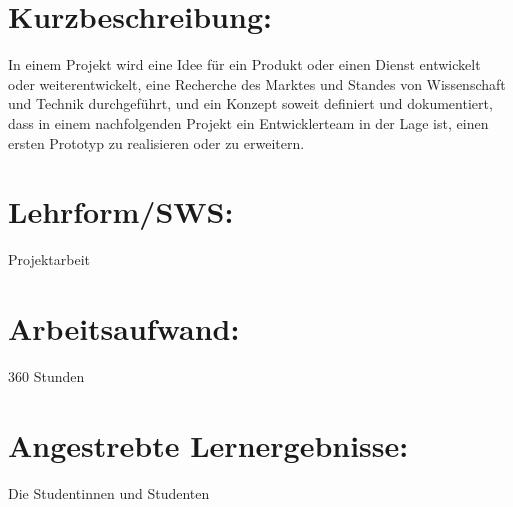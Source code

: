 \section*{Kurzbeschreibung:\label{/mi-2017/modulbeschreibungen-master/MA_Modul_Projekt_Vision&Konzept}}\label{kurzbeschreibungpathlabelmi-2017modulbeschreibungen-mastermaux5fmodulux5fprojektux5fvisionkonzept}

In einem Projekt wird eine Idee für ein Produkt oder einen Dienst
entwickelt oder weiterentwickelt, eine Recherche des Marktes und Standes
von Wissenschaft und Technik durchgeführt, und ein Konzept soweit
definiert und dokumentiert, dass in einem nachfolgenden Projekt ein
Entwicklerteam in der Lage ist, einen ersten Prototyp zu realisieren
oder zu erweitern.

\section*{Lehrform/SWS:\label{/mi-2017/modulbeschreibungen-master/MA_Modul_Projekt_Vision&Konzept}}\label{lehrformswspathlabelmi-2017modulbeschreibungen-mastermaux5fmodulux5fprojektux5fvisionkonzept}

Projektarbeit

\section*{Arbeitsaufwand:\label{/mi-2017/modulbeschreibungen-master/MA_Modul_Projekt_Vision&Konzept}}\label{arbeitsaufwandpathlabelmi-2017modulbeschreibungen-mastermaux5fmodulux5fprojektux5fvisionkonzept}

360 Stunden

\section*{Angestrebte
Lernergebnisse:\label{/mi-2017/modulbeschreibungen-master/MA_Modul_Projekt_Vision&Konzept}}\label{angestrebte-lernergebnissepathlabelmi-2017modulbeschreibungen-mastermaux5fmodulux5fprojektux5fvisionkonzept}

Die Studentinnen und Studenten

